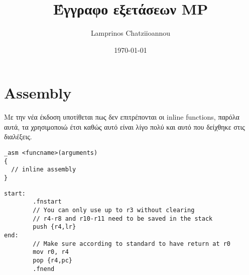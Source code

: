 \documentclass[11pt]{article}
\author{Lamprinos Chatziioannou}
\date{\today}
\title{Έγγραφο εξετάσεων MP}
\begin{document}
\maketitle
\tableofcontents

\section{Assembly}
\label{sec:org5b0d8e3}
\begin{note}
Με την νέα έκδοση υποτίθεται πως δεν επιτρέπονται οι inline functions,
παρόλα αυτά, τα χρησιμοποιώ έτσι καθώς αυτό είναι λίγο πολύ και αυτό
που δείχθηκε στις διαλέξεις.
\label{orgca96e13}
\end{note}
\begin{verbatim}
_asm <funcname>(arguments)
{
  // inline assembly
}
\end{verbatim}

\begin{verbatim}
start:
        .fnstart
        // You can only use up to r3 without clearing
        // r4-r8 and r10-r11 need to be saved in the stack
        push {r4,lr}
end:
        // Make sure according to standard to have return at r0
        mov r0, r4
        pop {r4,pc}
        .fnend
\end{verbatim}
\end{document}
